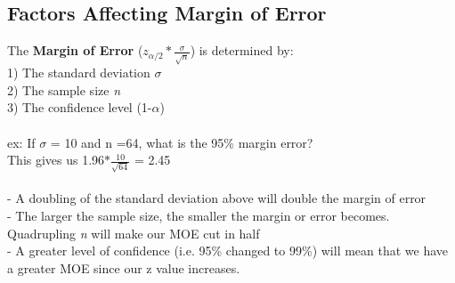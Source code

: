 \documentclass[12pt, a4paper]{article}
\begin{document}
	\subsection{Factors Affecting Margin of Error}
	The \textbf{Margin of Error} ($z_{\alpha/2} *\frac{\sigma}{\sqrt{n}}$) is determined by: \\
	1) The standard deviation $\sigma$ \\
	2) The sample size \textit{n} \\
	3) The confidence level (1-$\alpha$) \\~\\
	ex: If $\sigma$ = 10 and n =64, what is the 95\% margin error? \\
	This gives us 1.96$*\frac{10}{\sqrt{64}}$ = 2.45 \\~\\
	- A doubling of the standard deviation above will double the margin of error \\
	- The larger the sample size, the smaller the margin or error becomes. Quadrupling \textit{n} will \hspace*{2.5mm} make our MOE cut in half \\
	- A greater level of confidence (i.e. 95\%  changed to 99\%) will mean that we have a greater \hspace*{2.5mm} MOE since our z value increases. \\~\\
	
\end{document}

